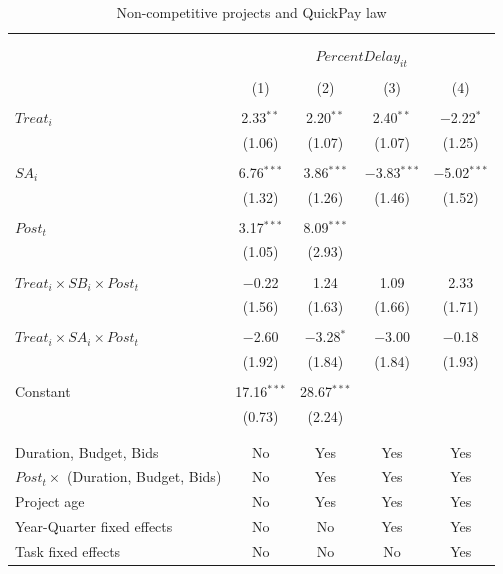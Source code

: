 \documentclass[]{article}
\begin{document}
\begin{table}[H] \centering 
  \caption{Non-competitive projects and QuickPay law} 
  \label{} 
\small 
\begin{tabular}{@{\extracolsep{-2pt}}lcccc} 
\\[-1.8ex]\hline 
\hline \\[-1.8ex] 
\\[-1.8ex] & \multicolumn{4}{c}{$PercentDelay_{it}$  } \\ 
\\[-1.8ex] & (1) & (2) & (3) & (4)\\ 
\hline \\[-1.8ex] 
 $Treat_i$ & 2.33$^{**}$ & 2.20$^{**}$ & 2.40$^{**}$ & $-$2.22$^{*}$ \\ 
  & (1.06) & (1.07) & (1.07) & (1.25) \\ 
  & & & & \\ 
 $SA_i$ & 6.76$^{***}$ & 3.86$^{***}$ & $-$3.83$^{***}$ & $-$5.02$^{***}$ \\ 
  & (1.32) & (1.26) & (1.46) & (1.52) \\ 
  & & & & \\ 
 $Post_t$ & 3.17$^{***}$ & 8.09$^{***}$ &  &  \\ 
  & (1.05) & (2.93) &  &  \\ 
  & & & & \\ 
 $Treat_i \times SB_i \times Post_t$ & $-$0.22 & 1.24 & 1.09 & 2.33 \\ 
  & (1.56) & (1.63) & (1.66) & (1.71) \\ 
  & & & & \\ 
 $Treat_i \times SA_i \times Post_t$ & $-$2.60 & $-$3.28$^{*}$ & $-$3.00 & $-$0.18 \\ 
  & (1.92) & (1.84) & (1.84) & (1.93) \\ 
  & & & & \\ 
 Constant & 17.16$^{***}$ & 28.67$^{***}$ &  &  \\ 
  & (0.73) & (2.24) &  &  \\ 
  & & & & \\ 
\hline \\[-1.8ex] 
Duration, Budget, Bids & No & Yes & Yes & Yes \\ 
$Post_t \times $  (Duration, Budget, Bids) & No & Yes & Yes & Yes \\ 
Project age & No & Yes & Yes & Yes \\ 
Year-Quarter fixed effects & No & No & Yes & Yes \\ 
Task fixed effects & No & No & No & Yes \\ 

\end{tabular}
\end{table}
\end{document}
